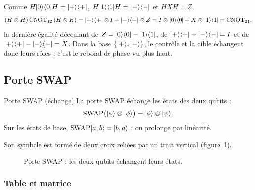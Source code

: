 \begin{remarque}\label{rem:HHCNOT}
Comme $H|0\rangle\langle 0|H=|+\rangle\langle +|$, $H|1\rangle\langle 1|H=|-\rangle\langle -|$ et $HXH=Z$,
\[
  (H\otimes H)\,\mathrm{CNOT}_{12}\,(H\otimes H)
  =|+\rangle\langle +|\otimes I+|-\rangle\langle -|\otimes Z
  =I\otimes|0\rangle\langle 0|+X\otimes|1\rangle\langle 1|=\mathrm{CNOT}_{21},
\]
la dernière égalité découlant de $Z=|0\rangle\langle 0|-|1\rangle\langle 1|$, de
$|+\rangle\langle +|+|-\rangle\langle -|=I$ et de $|+\rangle\langle +|-|-\rangle\langle -|=X$. Dans la base
$\{|+\rangle,|-\rangle\}$, le contrôle et la cible échangent donc leurs rôles : c'est le rebond de phase
vu plus haut.
\end{remarque}

\subsection{Porte SWAP}\label{sec:swap}

\begin{definition}{Porte SWAP (échange)}
La porte SWAP échange les états des deux qubits :
\[
  \mathrm{SWAP}\big(|\psi\rangle\otimes|\phi\rangle\big)=|\phi\rangle\otimes|\psi\rangle.
\]
Sur les états de base, $\mathrm{SWAP}|a,b\rangle=|b,a\rangle$ ; on prolonge par linéarité.
\end{definition}

Son symbole est formé de deux croix reliées par un trait vertical
(figure~\ref{fig:swap}).

\begin{figure}[!ht]
\centering
{}
\caption{Porte SWAP : les deux qubits échangent leurs états.}
\label{fig:swap}
\end{figure}

\subsubsection{Table et matrice}

